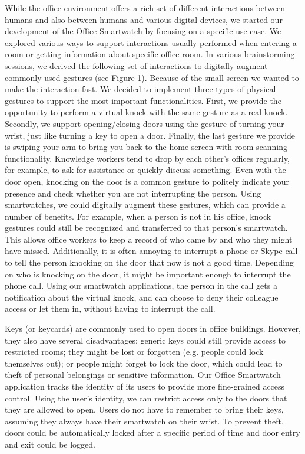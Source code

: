 \documentclass{article}
\begin{document}
While the office environment offers a rich set of
different interactions between humans and also
between humans and various digital devices, we started
our development of the Office Smartwatch by focusing
on a specific use case. We explored various ways to
support interactions usually performed when entering a
room or getting information about specific office room.
In various brainstorming sessions, we derived the
following set of interactions to digitally augment
commonly used gestures (see Figure 1). Because of the
small screen we wanted to make the interaction fast.
We decided to implement three types of physical
gestures to support the most important functionalities.
First, we provide the opportunity to perform a virtual
knock with the same gesture as a real knock. Secondly,
we support opening/closing doors using the gesture of
turning your wrist, just like turning a key to open a
door. Finally, the last gesture we provide is swiping
your arm to bring you back to the home screen with
room scanning functionality.
Knowledge workers tend to drop by each other’s offices
regularly, for example, to ask for assistance or quickly
discuss something. Even with the door open, knocking
on the door is a common gesture to politely indicate
your presence and check whether you are not
interrupting the person. Using smartwatches, we could
digitally augment these gestures, which can provide a
number of benefits. For example, when a person is not
in his office, knock gestures could still be recognized
and transferred to that person’s smartwatch. This
allows office workers to keep a record of who came by
and who they might have missed. Additionally, it is
often annoying to interrupt a phone or Skype call to tell
the person knocking on the door that now is not a good
time. Depending on who is knocking on the door, it
might be important enough to interrupt the phone call.
Using our smartwatch applications, the person in the
call gets a notification about the virtual knock, and can
choose to deny their colleague access or let them in,
without having to interrupt the call. 

Keys (or keycards) are commonly used to open doors in
office buildings. However, they also have several
disadvantages: generic keys could still provide access
to restricted rooms; they might be lost or forgotten
(e.g. people could lock themselves out); or people
might forget to lock the door, which could lead to theft
of personal belongings or sensitive information. Our
Office Smartwatch application tracks the identity of its
users to provide more fine-grained access control.
Using the user’s identity, we can restrict access only to
the doors that they are allowed to open. Users do not
have to remember to bring their keys, assuming they
always have their smartwatch on their wrist. To prevent
theft, doors could be automatically locked after a
specific period of time and door entry and exit could be
logged. 
\end{document}
